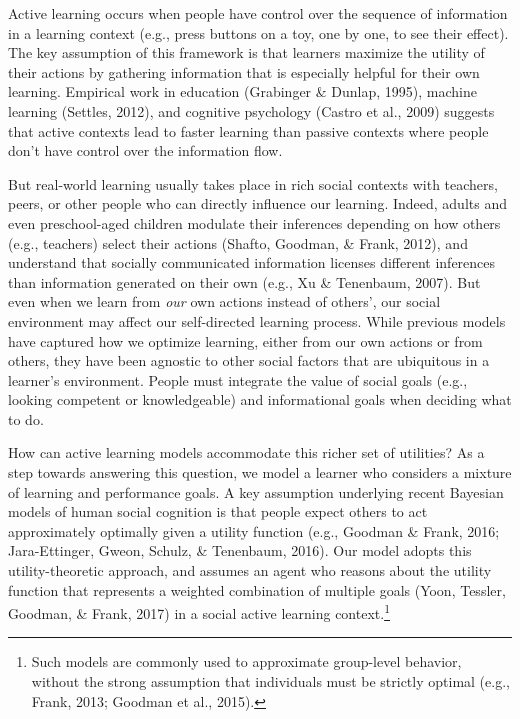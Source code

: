 \documentclass[10pt, letterpaper]{article}
\begin{document}
Active learning occurs when people have control over the sequence of
information in a learning context (e.g., press buttons on a toy, one by
one, to see their effect). The key assumption of this framework is that
learners maximize the utility of their actions by gathering information
that is especially helpful for their own learning. Empirical work in
education (Grabinger \& Dunlap, 1995), machine learning (Settles, 2012),
and cognitive psychology (Castro et al., 2009) suggests that active
contexts lead to faster learning than passive contexts where people
don't have control over the information flow.

But real-world learning usually takes place in rich social contexts with
teachers, peers, or other people who can directly influence our
learning. Indeed, adults and even preschool-aged children modulate their
inferences depending on how others (e.g., teachers) select their actions
(Shafto, Goodman, \& Frank, 2012), and understand that socially
communicated information licenses different inferences than information
generated on their own (e.g., Xu \& Tenenbaum, 2007). But even when we
learn from \emph{our} own actions instead of others', our social
environment may affect our self-directed learning process. While
previous models have captured how we optimize learning, either from our
own actions or from others, they have been agnostic to other social
factors that are ubiquitous in a learner's environment. People must
integrate the value of social goals (e.g., looking competent or
knowledgeable) and informational goals when deciding what to do.

How can active learning models accommodate this richer set of utilities?
As a step towards answering this question, we model a learner who
considers a mixture of learning and performance goals. A key assumption
underlying recent Bayesian models of human social cognition is that
people expect others to act approximately optimally given a utility
function (e.g., Goodman \& Frank, 2016; Jara-Ettinger, Gweon, Schulz, \&
Tenenbaum, 2016). Our model adopts this utility-theoretic approach, and
assumes an agent who reasons about the utility function that represents
a weighted combination of multiple goals (Yoon, Tessler, Goodman, \&
Frank, 2017) in a social active learning context.\footnote{Such models
  are commonly used to approximate group-level behavior, without the
  strong assumption that individuals must be strictly optimal (e.g.,
  Frank, 2013; Goodman et al., 2015).}
\end{document}
